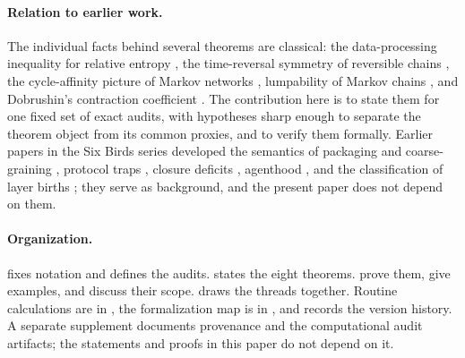 \paragraph{Relation to earlier work.}
The individual facts behind several theorems are classical: the data-processing inequality for relative entropy \citep{CoverThomas2006}, the time-reversal symmetry of reversible chains \citep{Kelly1979}, the cycle-affinity picture of Markov networks \citep{Schnakenberg1976}, lumpability of Markov chains \citep{KemenySnell1960,Buchholz1994}, and Dobrushin's contraction coefficient \citep{Dobrushin1956,Seneta2006}.
The contribution here is to state them for one fixed set of exact audits, with hypotheses sharp enough to separate the theorem object from its common proxies, and to verify them formally.
Earlier papers in the Six Birds series developed the semantics of packaging and coarse-graining \citep{SB_LAY}, protocol traps \citep{SB_PROTOCOL_TRAP}, closure deficits \citep{SB_CAST}, agenthood \citep{SB_THROW}, and the classification of layer births \citep{SB_CLASSIFY}; they serve as background, and the present paper does not depend on them.

\paragraph{Organization.}
 fixes notation and defines the audits.
 states the eight theorems.
 prove them, give examples, and discuss their scope.
 draws the threads together.
Routine calculations are in , the formalization map is in , and  records the version history.
A separate supplement documents provenance and the computational audit artifacts; the statements and proofs in this paper do not depend on it.
